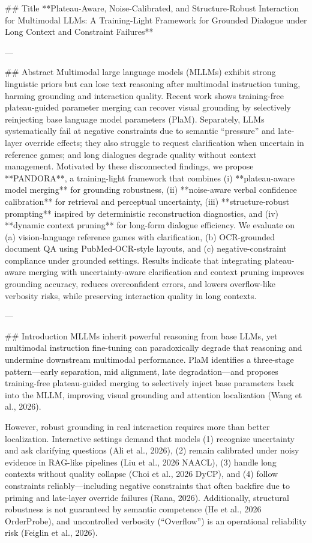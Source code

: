 ## Title  
**Plateau-Aware, Noise-Calibrated, and Structure-Robust Interaction for Multimodal LLMs: A Training-Light Framework for Grounded Dialogue under Long Context and Constraint Failures**

---

## Abstract  
Multimodal large language models (MLLMs) exhibit strong linguistic priors but can lose text reasoning after multimodal instruction tuning, harming grounding and interaction quality. Recent work shows training-free plateau-guided parameter merging can recover visual grounding by selectively reinjecting base language model parameters (PlaM). Separately, LLMs systematically fail at negative constraints due to semantic “pressure” and late-layer override effects; they also struggle to request clarification when uncertain in reference games; and long dialogues degrade quality without context management. Motivated by these disconnected findings, we propose **PANDORA**, a training-light framework that combines (i) **plateau-aware model merging** for grounding robustness, (ii) **noise-aware verbal confidence calibration** for retrieval and perceptual uncertainty, (iii) **structure-robust prompting** inspired by deterministic reconstruction diagnostics, and (iv) **dynamic context pruning** for long-form dialogue efficiency. We evaluate on (a) vision-language reference games with clarification, (b) OCR-grounded document QA using PubMed-OCR-style layouts, and (c) negative-constraint compliance under grounded settings. Results indicate that integrating plateau-aware merging with uncertainty-aware clarification and context pruning improves grounding accuracy, reduces overconfident errors, and lowers overflow-like verbosity risks, while preserving interaction quality in long contexts.

---

## Introduction  
MLLMs inherit powerful reasoning from base LLMs, yet multimodal instruction fine-tuning can paradoxically degrade that reasoning and undermine downstream multimodal performance. PlaM identifies a three-stage pattern—early separation, mid alignment, late degradation—and proposes training-free plateau-guided merging to selectively inject base parameters back into the MLLM, improving visual grounding and attention localization (Wang et al., 2026).  

However, robust grounding in real interaction requires more than better localization. Interactive settings demand that models (1) recognize uncertainty and ask clarifying questions (Ali et al., 2026), (2) remain calibrated under noisy evidence in RAG-like pipelines (Liu et al., 2026 NAACL), (3) handle long contexts without quality collapse (Choi et al., 2026 DyCP), and (4) follow constraints reliably—including negative constraints that often backfire due to priming and late-layer override failures (Rana, 2026). Additionally, structural robustness is not guaranteed by semantic competence (He et al., 2026 OrderProbe), and uncontrolled verbosity (“Overflow”) is an operational reliability risk (Feiglin et al., 2026).  

